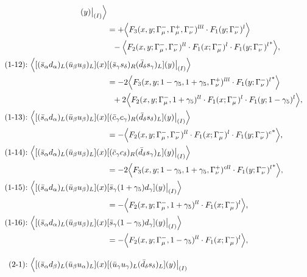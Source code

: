 \begin{align}
[(\bar s_\gamma s_\gamma)_R(\bar d_\delta s_\delta)_L](y)\big|_{(I)}
\Big\rangle
\notag\\*
&=
 + \Big\langle F_3(x,y;\Gamma_\mu^-,\Gamma_\mu^+,\Gamma_\nu^-)^{lll} \cdot F_1(y;\Gamma_\nu^-)^l\Big\rangle
\notag\\*&\ \ 
 - \Big\langle F_2(x,y;\Gamma_\mu^-,\Gamma_\nu^-)^{ll} \cdot F_1(x;\Gamma_\mu^-)^l \cdot {F_1(y;\Gamma_\nu^-)^l}^*\Big\rangle,
\\
\mbox{(1-12):}\ 
\Big\langle
[(\bar s_\alpha d_\alpha)_L(\bar u_\beta u_\beta)_L](x)&
[(\bar s_\gamma s_\delta)_R(\bar d_\delta s_\gamma)_L](y)\big|_{(I)}
\Big\rangle
\notag\\*
&=
-2\Big\langle F_3(x,y;1-\gamma_5,1+\gamma_5,\Gamma_\nu^+)^{lll} \cdot {F_1(y;\Gamma_\nu^-)^l}^*\Big\rangle
\notag\\*&\ \ 
 + 2\Big\langle F_2(x,y;\Gamma_\mu^-,1+\gamma_5)^{ll} \cdot F_1(x;\Gamma_\mu^-)^l \cdot F_1(y;1-\gamma_5)^l\Big\rangle,
\\
\mbox{(1-13):}\ 
\Big\langle
[(\bar s_\alpha d_\alpha)_L(\bar u_\beta u_\beta)_L](x)&
[(\bar c_\gamma c_\gamma)_R(\bar d_\delta s_\delta)_L](y)\big|_{(I)}
\Big\rangle
\notag\\*
&=
 - \Big\langle F_2(x,y;\Gamma_\mu^-,\Gamma_\nu^-)^{ll} \cdot F_1(x;\Gamma_\mu^-)^l \cdot {F_1(y;\Gamma_\nu^-)^c}^*\Big\rangle,
\\
\mbox{(1-14):}\ 
\Big\langle
[(\bar s_\alpha d_\alpha)_L(\bar u_\beta u_\beta)_L](x)&
[(\bar c_\gamma c_\delta)_R(\bar d_\delta s_\gamma)_L](y)\big|_{(I)}
\Big\rangle
\notag\\*
&=
-2\Big\langle F_3(x,y;1-\gamma_5,1+\gamma_5,\Gamma_\nu^+)^{cll} \cdot {F_1(y;\Gamma_\nu^-)^l}^*\Big\rangle,
\\
\mbox{(1-15):}\ 
\Big\langle
[(\bar s_\alpha d_\alpha)_L(\bar u_\beta u_\beta)_L](x)&
[\bar s_\gamma (1 + \gamma_5) d_\gamma](y)\big|_{(I)}
\Big\rangle
\notag\\*
&=
 - \Big\langle F_2(x,y;\Gamma_\mu^-,1+\gamma_5)^{ll} \cdot F_1(x;\Gamma_\mu^-)^l\Big\rangle,
\\
\mbox{(1-16):}\ 
\Big\langle
[(\bar s_\alpha d_\alpha)_L(\bar u_\beta u_\beta)_L](x)&
[\bar s_\gamma (1 - \gamma_5) d_\gamma](y)\big|_{(I)}
\Big\rangle
\notag\\*
&=
 - \Big\langle F_2(x,y;\Gamma_\mu^-,1-\gamma_5)^{ll} \cdot F_1(x;\Gamma_\mu^-)^l\Big\rangle,
\\[3mm]
\mbox{(2-1):}\ 
\Big\langle
[(\bar s_\alpha d_\beta)_L(\bar u_\beta u_\alpha)_L](x)&
[(\bar u_\gamma u_\gamma)_L(\bar d_\delta s_\delta)_L](y)\big|_{(I)}

\end{align}
